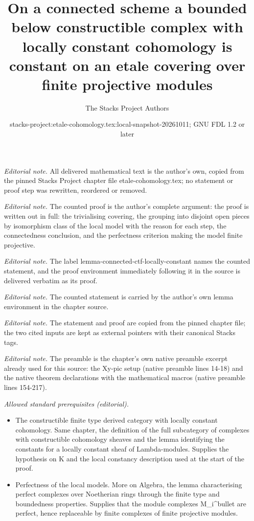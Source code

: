 \documentclass[10pt,a4paper]{amsart}
\title{On a connected scheme a bounded below constructible complex with locally constant cohomology is constant on an etale covering over finite projective modules}
\author{The Stacks Project Authors}
\date{stacks-project:etale-cohomology.tex:local-snapshot-20261011; GNU FDL 1.2 or later}
\theoremstyle{plain}
\theoremstyle{definition}
\theoremstyle{remark}
\numberwithin{equation}{subsection}
\begin{document}
\maketitle
\noindent\textit{Editorial note.} All delivered mathematical text is the author's own, copied from the pinned Stacks Project chapter file etale-cohomology.tex; no statement or proof step was rewritten, reordered or removed.\par\medskip
\noindent\textit{Editorial note.} The counted proof is the author's complete argument: the proof is written out in full: the trivialising covering, the grouping into disjoint open pieces by isomorphism class of the local model with the reason for each step, the connectedness conclusion, and the perfectness criterion making the model finite projective.\par\medskip
\noindent\textit{Editorial note.} The label lemma-connected-ctf-locally-constant names the counted statement, and the proof environment immediately following it in the source is delivered verbatim as its proof.\par\medskip
\noindent\textit{Editorial note.} The counted statement is carried by the author's own lemma environment in the chapter source.\par\medskip
\noindent\textit{Editorial note.} The statement and proof are copied from the pinned chapter file; the two cited inputs are kept as external pointers with their canonical Stacks tags.\par\medskip
\noindent\textit{Editorial note.} The preamble is the chapter's own native preamble excerpt already used for this source: the Xy-pic setup (native preamble lines 14-18) and the native theorem declarations with the mathematical macros (native preamble lines 154-217).\par\medskip
\noindent\textit{Allowed standard prerequisites (editorial).}\begin{itemize}
\item The constructible finite type derived category with locally constant cohomology. Same chapter, the definition of the full subcategory of complexes with constructible cohomology sheaves and the lemma identifying the constants for a locally constant sheaf of Lambda-modules. Supplies the hypothesis on K and the local constancy description used at the start of the proof.
\item Perfectness of the local models. More on Algebra, the lemma characterising perfect complexes over Noetherian rings through the finite type and boundedness properties. Supplies that the module complexes M\_i\textasciicircum{}bullet are perfect, hence replaceable by finite complexes of finite projective modules.
\end{itemize}\medskip
\end{document}
